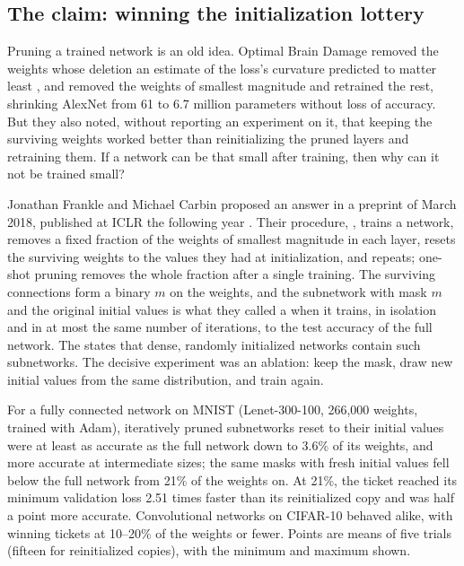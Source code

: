 \begin{refsection}
\section{The claim: winning the initialization lottery}\label{sec:ablations:claim}

Pruning a trained network is an old idea. Optimal Brain Damage removed the weights whose deletion an estimate of the loss's curvature predicted to matter least \parencite{LeCunDenkerSolla1990}, and \textcite{HanEtAl2015} removed the weights of smallest magnitude and retrained the rest, shrinking AlexNet from 61 to 6.7 million parameters without loss of accuracy. But they also noted, without reporting an experiment on it, that keeping the surviving weights worked better than reinitializing the pruned layers and retraining them. If a network can be that small after training, then why can it not be trained small?

Jonathan Frankle and Michael Carbin proposed an answer in a preprint of March 2018, published at ICLR the following year \parencite{FrankleCarbin2019}. Their procedure, , trains a network, removes a fixed fraction of the weights of smallest magnitude in each layer, resets the surviving weights to the values they had at initialization, and repeats; one-shot pruning removes the whole fraction after a single training. The surviving connections form a binary  $m$ on the weights, and the subnetwork with mask $m$ and the original initial values is what they called a  when it trains, in isolation and in at most the same number of iterations, to the test accuracy of the full network. The  states that dense, randomly initialized networks contain such subnetworks. The decisive experiment was an ablation: keep the mask, draw new initial values from the same distribution, and train again.

\begin{finding}\label{fd:ablations:tickets}
For a fully connected network on MNIST (Lenet-300-100, 266,000 weights, trained with Adam), iteratively pruned subnetworks reset to their initial values were at least as accurate as the full network down to 3.6\% of its weights, and more accurate at intermediate sizes; the same masks with fresh initial values fell below the full network from 21\% of the weights on. At 21\%, the ticket reached its minimum validation loss 2.51 times faster than its reinitialized copy and was half a point more accurate. Convolutional networks on CIFAR-10 behaved alike, with winning tickets at 10--20\% of the weights or fewer. Points are means of five trials (fifteen for reinitialized copies), with the minimum and maximum shown.
\end{finding}


\end{refsection}
